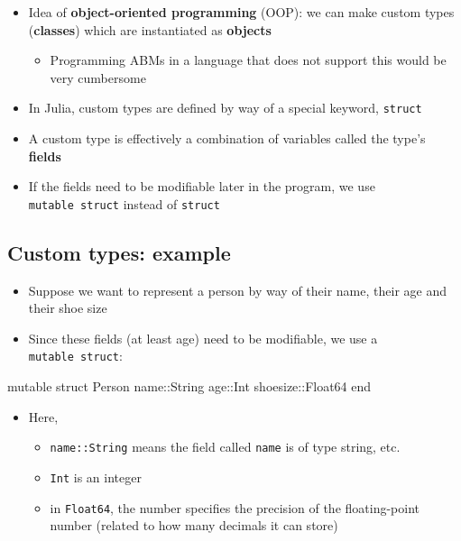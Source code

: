 \documentclass[
  letterpaper,
  DIV=11,
  numbers=noendperiod]{scrartcl}
\newenvironment{Shaded}{\begin{snugshade}}{\end{snugshade}}
\newcommand{\DataTypeTok}[1]{\textcolor[rgb]{0.68,0.00,0.00}{#1}}
\newcommand{\KeywordTok}[1]{\textcolor[rgb]{0.00,0.23,0.31}{#1}}
\newcommand{\NormalTok}[1]{\textcolor[rgb]{0.00,0.23,0.31}{#1}}
\newcommand{\OperatorTok}[1]{\textcolor[rgb]{0.37,0.37,0.37}{#1}}
\providecommand{\tightlist}{%
  \setlength{\itemsep}{0pt}\setlength{\parskip}{0pt}}\usepackage{longtable,booktabs,array}
\begin{document}
\begin{itemize}
\tightlist
\item
  Idea of \textbf{object-oriented programming} (OOP): we can make custom
  types (\textbf{classes}) which are instantiated as \textbf{objects}

  \begin{itemize}
  \tightlist
  \item
    Programming ABMs in a language that does not support this would be
    very cumbersome
  \end{itemize}
\item
  In Julia, custom types are defined by way of a special keyword,
  \texttt{struct}
\item
  A custom type is effectively a combination of variables called the
  type's \textbf{fields}
\item
  If the fields need to be modifiable later in the program, we use
  \texttt{mutable\ struct} instead of \texttt{struct}
\end{itemize}

\subsection{Custom types: example}\label{custom-types-example}

\begin{itemize}
\tightlist
\item
  Suppose we want to represent a person by way of their name, their age
  and their shoe size
\item
  Since these fields (at least age) need to be modifiable, we use a
  \texttt{mutable\ struct}:
\end{itemize}

\begin{Shaded}
\begin{Highlighting}[]
\KeywordTok{mutable struct}\NormalTok{ Person}
\NormalTok{  name}\OperatorTok{::}\DataTypeTok{String}
\NormalTok{  age}\OperatorTok{::}\DataTypeTok{Int}
\NormalTok{  shoesize}\OperatorTok{::}\DataTypeTok{Float64}
\KeywordTok{end}
\end{Highlighting}
\end{Shaded}

\begin{itemize}
\tightlist
\item
  Here,

  \begin{itemize}
  \tightlist
  \item
    \texttt{name::String} means the field called \texttt{name} is of
    type string, etc.
  \item
    \texttt{Int} is an integer
  \item
    in \texttt{Float64}, the number specifies the precision of the
    floating-point number (related to how many decimals it can store)
  \end{itemize}
\end{itemize}
\end{document}
